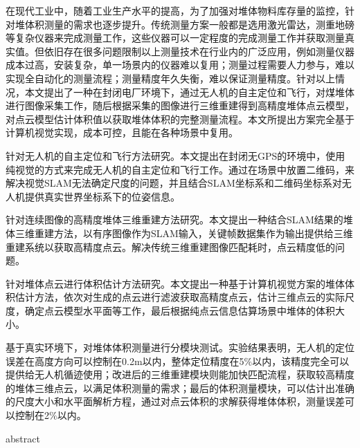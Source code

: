 \begin{cabstract}  
  在现代工业中，随着工业生产水平的提高，为了加强对堆体物料库存量的监控，针对堆体积测量的需求也逐步提升。传统测量方案一般都是选用激光雷达，测重地磅等复杂仪器来完成测量工作，这些仪器可以一定程度的完成测量工作并获取测量真实值。但依旧存在很多问题限制以上测量技术在行业内的广泛应用，例如测量仪器成本过高，安装复杂，单一场景内的仪器难以复用；测量过程需要人力参与，难以实现全自动化的测量流程；测量精度年久失衡，难以保证测量精度。针对以上情况，本文提出了一种在封闭电厂环境下，通过无人机的自主定位和飞行，对煤堆体进行图像采集工作，随后根据采集的图像进行三维重建得到高精度堆体点云模型，对点云模型估计体积值以获取堆体体积的完整测量流程。本文所提出方案完全基于计算机视觉实现，成本可控，且能在各种场景中复用。
  
  针对无人机的自主定位和飞行方法研究。本文提出在封闭无GPS的环境中，使用纯视觉的方式来完成无人机的自主定位和飞行工作。通过在场景中放置二维码，来解决视觉SLAM无法确定尺度的问题，并且结合SLAM坐标系和二维码坐标系对无人机提供真实世界坐标系下的位姿信息。
  
  针对连续图像的高精度堆体三维重建方法研究。本文提出一种结合SLAM结果的堆体三维重建方法，以有序图像作为SLAM输入，关键帧数据集作为输出提供给三维重建系统以获取高精度点云。解决传统三维重建图像匹配耗时，点云精度低的问题。
  
  针对堆体点云进行体积估计方法研究。本文提出一种基于计算机视觉方案的堆体体积估计方法，依次对生成的点云进行滤波获取高精度点云，估计三维点云的实际尺度，确定点云模型水平面等工作，最后根据纯点云信息估算场景中堆体的体积大小。
  
  基于真实环境下，对堆体体积测量进行分模块测试。实验结果表明，无人机的定位误差在高度方向可以控制在0.2m以内，整体定位精度在5$\%$以内，该精度完全可以提供给无人机循迹使用；改进后的三维重建模块则能加快匹配流程，获取较高精度的堆体三维点云，以满足体积测量的需求；最后的体积测量模块，可以估计出准确的尺度大小和水平面解析方程，通过对点云体积的求解获得堆体体积，测量误差可以控制在2$\%$以内。
\end{cabstract}


\begin{eabstract}
abstract
\end{eabstract}

